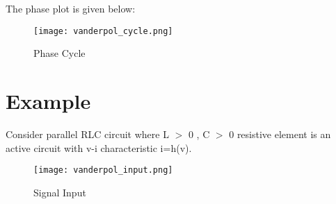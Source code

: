 \documentclass[11pt,a4 paper]{report}
\begin{document}
\par The phase plot is given below:
\begin{figure}[H]
\centering
\texttt{[image: vanderpol\_cycle.png]}
\caption{Phase Cycle}
\end{figure}

\section{Example}
\par 
Consider parallel RLC circuit where L $>$ 0 , C $>$ 0 resistive element is an active circuit with v-i characteristic i=h(v).

\begin{figure}[H]
\centering
\texttt{[image: vanderpol\_input.png]}
\caption{Signal Input}
\end{figure}




\end{document}
